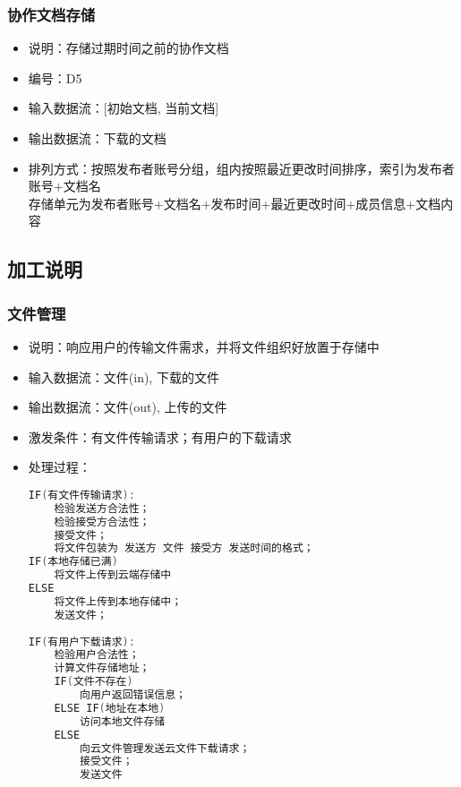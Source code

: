             \subsubsection{协作文档存储}
            \begin{itemize}
                \item 说明：存储过期时间之前的协作文档
                \item 编号：D5
                \item 输入数据流：[初始文档, 当前文档]
                \item 输出数据流：下载的文档
                \item 排列方式：按照发布者账号分组，组内按照最近更改时间排序，索引为发布者账号+文档名\\
                         存储单元为发布者账号+文档名+发布时间+最近更改时间+成员信息+文档内容\\
            \end{itemize}
        \subsection{加工说明}
            \subsubsection{文件管理}
            \begin{itemize}
                \item 说明：响应用户的传输文件需求，并将文件组织好放置于存储中
                \item 输入数据流：文件(in), 下载的文件
                \item 输出数据流：文件(out), 上传的文件
                \item 激发条件：有文件传输请求；有用户的下载请求
                \item 处理过程：
\begin{lstlisting}[language=C, caption=文件管理, label={code:first-code}]
IF(有文件传输请求):
    检验发送方合法性；
    检验接受方合法性；
    接受文件；
    将文件包装为 发送方 文件 接受方 发送时间的格式；
IF(本地存储已满) 
    将文件上传到云端存储中
ELSE 
    将文件上传到本地存储中；
    发送文件；
                
IF(有用户下载请求):
    检验用户合法性；
    计算文件存储地址；
    IF(文件不存在) 
        向用户返回错误信息；
    ELSE IF(地址在本地)
        访问本地文件存储
    ELSE 
        向云文件管理发送云文件下载请求；
        接受文件；
        发送文件
\end{lstlisting}
            \end{itemize}    
